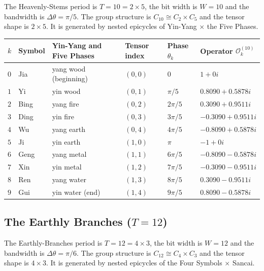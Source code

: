 \begin{definition}\label{def:tiangan_operators}
The Heavenly-Stems period is $T=10=2 \times 5$, the bit width is $W=10$ and the bandwidth is $\Delta\theta=\pi/5$. The group structure is $C_{10} \cong C_2 \times C_5$ and the tensor shape is $2 \times 5$. It is generated by nested epicycles of Yin-Yang $\times$ the Five Phases.
\end{definition}

\begin{center}
\begin{tabular}{>{\centering\arraybackslash}p{0.8cm}>{\centering\arraybackslash}p{1.6cm}>{\centering\arraybackslash}p{2.5cm}>{\centering\arraybackslash}p{1.8cm}>{\centering\arraybackslash}p{2cm}>{\centering\arraybackslash}p{3.3cm}}
\toprule
$k$ & Symbol & Yin-Yang and Five Phases & Tensor index & Phase $\theta_k$ & Operator $\mathcal{O}_k^{(10)}$ \\
\midrule
$0$ & Jia & yang wood (beginning) & $(0,0)$ & $0$ & $1+0i$ \\
$1$ & Yi & yin wood & $(0,1)$ & $\pi/5$ & $0.8090+0.5878i$ \\
$2$ & Bing & yang fire & $(0,2)$ & $2\pi/5$ & $0.3090+0.9511i$ \\
$3$ & Ding & yin fire & $(0,3)$ & $3\pi/5$ & $-0.3090+0.9511i$ \\
$4$ & Wu & yang earth & $(0,4)$ & $4\pi/5$ & $-0.8090+0.5878i$ \\
$5$ & Ji & yin earth & $(1,0)$ & $\pi$ & $-1+0i$ \\
$6$ & Geng & yang metal & $(1,1)$ & $6\pi/5$ & $-0.8090-0.5878i$ \\
$7$ & Xin & yin metal & $(1,2)$ & $7\pi/5$ & $-0.3090-0.9511i$ \\
$8$ & Ren & yang water & $(1,3)$ & $8\pi/5$ & $0.3090-0.9511i$ \\
$9$ & Gui & yin water (end) & $(1,4)$ & $9\pi/5$ & $0.8090-0.5878i$ \\
\bottomrule
\end{tabular}
\end{center}

\subsection{\texorpdfstring{The Earthly Branches ($T=12$)}{The Earthly Branches (T=12)}}

\begin{definition}\label{def:dizhi_operators}
The Earthly-Branches period is $T=12=4 \times 3$, the bit width is $W=12$ and the bandwidth is $\Delta\theta=\pi/6$. The group structure is $C_{12} \cong C_4 \times C_3$ and the tensor shape is $4 \times 3$. It is generated by nested epicycles of the Four Symbols $\times$ Sancai.
\end{definition}

